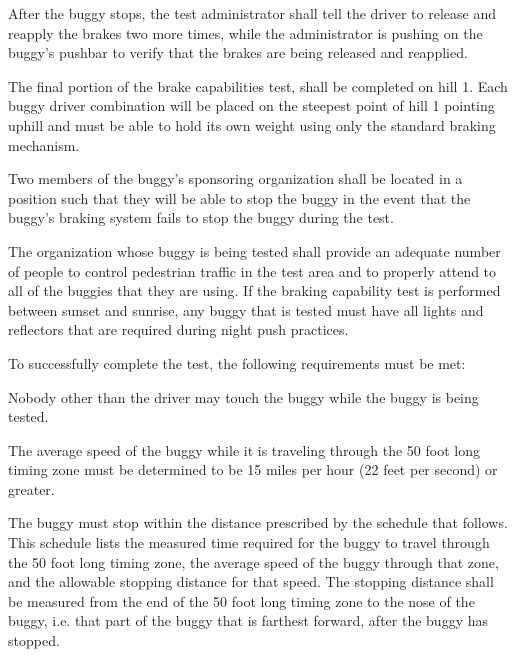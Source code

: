 After the buggy stops, the test administrator shall tell the driver to release and reapply the brakes two more times, while the administrator is pushing on the buggy's pushbar to verify that the brakes are being released and reapplied.

The final portion of the brake capabilities test, shall be completed on hill 1. Each buggy driver combination will be placed on the steepest point of hill 1 pointing uphill and must be able to hold its own weight using only the standard braking mechanism.

Two members of the buggy's sponsoring organization shall be located in a position such that they will be able to stop the buggy in the event that the buggy's braking system fails to stop the buggy during the test.

The organization whose buggy is being tested shall provide an adequate number of people to control pedestrian traffic in the test area and to properly attend to all of the buggies that they are using. If the braking capability test is performed between sunset and sunrise, any buggy that is tested must have all lights and reflectors that are required during night push practices.

To successfully complete the test, the following requirements must be met:

Nobody other than the driver may touch the buggy while the buggy is being tested.

The average speed of the buggy while it is traveling through the 50 foot long timing zone must be determined to be 15 miles per hour (22 feet per second) or greater.

The buggy must stop within the distance prescribed by the schedule that follows. This schedule lists the measured time required for the buggy to travel through the 50 foot long timing zone, the average speed of the buggy through that zone, and the allowable stopping distance for that speed. The stopping distance shall be measured from the end of the 50 foot long timing zone to the nose of the buggy, i.e. that part of the buggy that is farthest forward, after the buggy has stopped.


